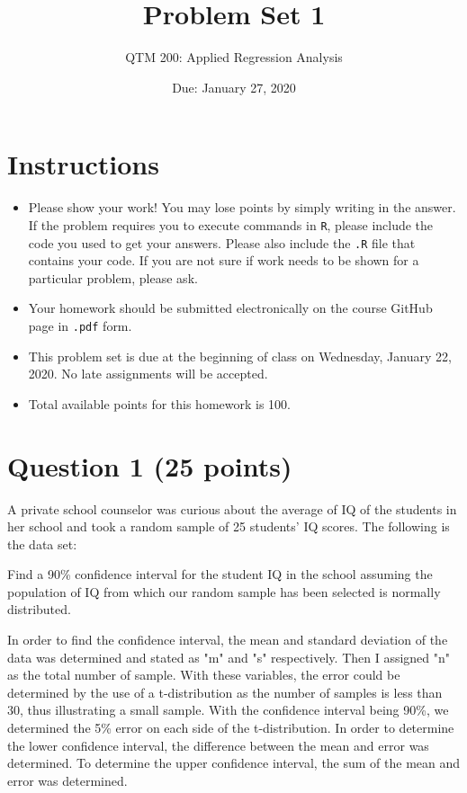 \documentclass[12pt,letterpaper]{article}
\title{Problem Set 1}
\date{Due: January 27, 2020}
\author{QTM 200: Applied Regression Analysis}
\begin{document}
	\maketitle
	
	\section*{Instructions}
	\begin{itemize}
		\item Please show your work! You may lose points by simply writing in the answer. If the problem requires you to execute commands in \texttt{R}, please include the code you used to get your answers. Please also include the \texttt{.R} file that contains your code. If you are not sure if work needs to be shown for a particular problem, please ask.
		\item Your homework should be submitted electronically on the course GitHub page in \texttt{.pdf} form.
		\item This problem set is due at the beginning of class on Wednesday, January 22, 2020. No late assignments will be accepted.
		\item Total available points for this homework is 100.
	\end{itemize}
	
	\vspace{1cm}
	\section*{Question 1 (25 points)}

A private school counselor was curious about the average of IQ of the students in her school and took a random sample of 25 students' IQ scores. The following is the data set:
\vspace{.5cm}

  

\vspace{.5cm}

\noindent Find a 90\% confidence interval for the student IQ in the school assuming the population of IQ from which our random sample has been selected is normally distributed. 



In order to find the confidence interval, the mean and standard deviation of the data was determined and stated as "m" and "s" respectively. Then I assigned "n" as the total number of sample. With these variables, the error could be determined by the use of a t-distribution as the number of samples is less than 30, thus illustrating a small sample. 
With the confidence interval being 90\%, we determined the 5\% error on each side of the t-distribution. In order to determine the lower confidence interval, the difference between the mean and error was determined. To determine the upper confidence interval, the sum of the mean and error was determined. 
\end{document}
